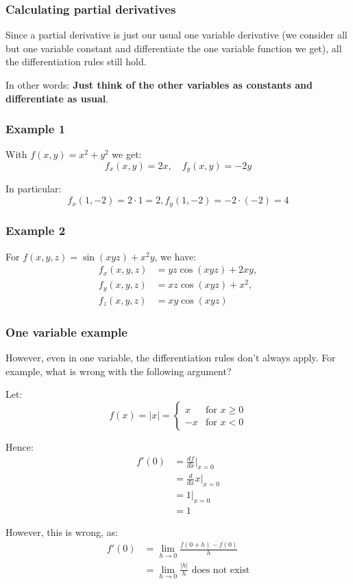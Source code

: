 \documentclass[11pt]{article}
\begin{document}
\subsubsection{Calculating partial derivatives}
\label{sec:org4493e0d}
Since a partial derivative is just our usual one variable derivative (we consider all but one variable constant and differentiate the one variable function we get), all the differentiation rules still hold.


In other words: \textbf{Just think of the other variables as constants and differentiate as usual}.
\subsubsection{Example 1}
\label{sec:org1346646}
With \(f(x, y) = x^2 + y^2\) we get:
\[f_x(x, y) = 2x, \quad f_y(x, y) = -2y\]

In particular:
\[f_x(1, -2) = 2 \cdot 1 = 2, f_y (1, -2) = -2 \cdot (-2) = 4\]
\subsubsection{Example 2}
\label{sec:orgd994f56}
For \(f(x, y, z) = \sin (xyz) + x^2 y\), we have:
\begin{align}
f_x(x, y, z) &= yz \cos (xyz) + 2xy, \\
f_y(x, y, z) &= xz \cos (xyz) + x^2, \\
f_z(x, y, z) &= xy \cos (xyz)
\end{align}
\subsubsection{One variable example}
\label{sec:org5e77be4}
However, even in one variable, the differentiation rules don't always apply. For example, what is wrong with the following argument?


Let:
\[
f(x) = |x| = \begin{cases}
x & \text{for } x \ge 0 \\
-x & \text{for } x < 0
\end{cases}
\]

Hence:
\begin{align*}
f'(0) &= \frac{df}{dx}|_{x = 0} \\
&= \frac{d}{dx}x|_{x = 0} \\
&= 1|_{x = 0} \\
&= 1
\end{align*}

However, this is wrong, as:
\begin{align*}
f'(0) &= \lim_{h \rightarrow 0} \frac{f(0 + h) - f(0)}{h} \\
&= \lim_{h \rightarrow 0} \frac{|h|}{h} \text{ does not exist}
\end{align*}
\end{document}
